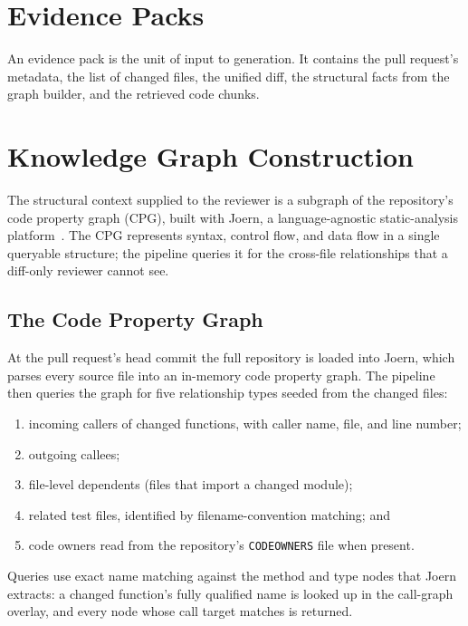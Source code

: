 \section{Evidence Packs}
\label{sec:approach-packs}

An evidence pack is the unit of input to generation. It contains the pull
request's metadata, the list of changed files, the unified diff, the
structural facts from the graph builder, and the retrieved code chunks.

\section{Knowledge Graph Construction}
\label{sec:approach-kg}

The structural context supplied to the reviewer is a subgraph of the
repository's code property graph (CPG), built with Joern, a
language-agnostic static-analysis platform~\cite{yamaguchi2014cpg}. The CPG
represents syntax, control flow, and data flow in a single queryable
structure; the pipeline queries it for the cross-file relationships that a
diff-only reviewer cannot see.

\subsection{The Code Property Graph}
\label{sec:approach-kg-cpg}

At the pull request's head commit the full repository is loaded into Joern,
which parses every source file into an in-memory code property graph. The
pipeline then queries the graph for five relationship types seeded from the
changed files:
%
\begin{enumerate}[leftmargin=*,itemsep=2pt,label=(\roman*)]
  \item incoming callers of changed functions, with caller name, file, and
        line number;
  \item outgoing callees;
  \item file-level dependents (files that import a changed module);
  \item related test files, identified by filename-convention matching; and
  \item code owners read from the repository's \texttt{CODEOWNERS} file when
        present.
\end{enumerate}
%
Queries use exact name matching against the method and type nodes that Joern
extracts: a changed function's fully qualified name is looked up in the
call-graph overlay, and every node whose call target matches is returned.

